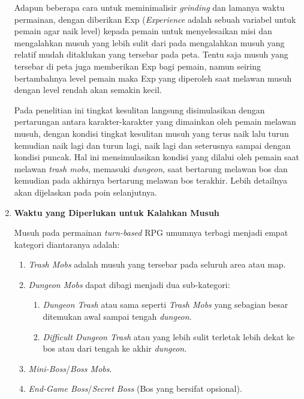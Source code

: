 \begin{subs}
\begin{enumerate}[label=\textbf{\arabic*).}]
		Adapun beberapa cara untuk meminimalisir \textit{grinding} dan lamanya waktu permainan, dengan diberikan Exp (\textit{Experience} adalah sebuah variabel untuk pemain agar naik level) kepada pemain untuk menyelesaikan misi dan mengalahkan musuh yang lebih sulit dari pada mengalahkan musuh yang relatif mudah ditaklukan yang tersebar pada peta. Tentu saja musuh yang tersebar di peta juga memberikan Exp bagi pemain, namun seiring bertambahnya level pemain maka Exp yang diperoleh saat melawan musuh dengan level rendah akan semakin kecil.
		\vspace{1ex}
		
		Pada penelitian ini tingkat kesulitan langsung disimulasikan dengan pertarungan antara karakter-karakter yang dimainkan oleh pemain melawan musuh, dengan kondisi tingkat kesulitan musuh yang terus naik lalu turun kemudian naik lagi dan turun lagi, naik lagi dan seterusnya sampai dengan kondisi puncak. Hal ini mensimulasikan kondisi yang dilalui oleh pemain saat melawan \textit{trash mobs}, memasuki \textit{dungeon}, saat bertarung melawan bos dan kemudian pada akhirnya bertarung melawan bos terakhir. Lebih detailnya akan dijelaskan pada poin selanjutnya.
		\vspace{1ex}
	
		\item \textbf{Waktu yang Diperlukan untuk Kalahkan Musuh}
	
		Musuh pada permainan \textit{turn-based} RPG umumnya terbagi menjadi empat kategori diantaranya adalah:
		
		\begin{enumerate}[label=\Alph*).]
			\item \textit{Trash Mobs} adalah musuh yang tersebar pada seluruh area atau map.
			\item \textit{Dungeon Mobs} dapat dibagi menjadi dua sub-kategori:
			\begin{enumerate}[label=\alph*).]
				\item \textit{Dungeon Trash} atau sama seperti \textit{Trash Mobs} yang sebagian besar ditemukan awal sampai tengah \textit{dungeon}.
				\item \textit{Difficult Dungeon Trash} atau yang lebih sulit terletak lebih dekat ke bos atau dari tengah ke akhir \textit{dungeon}.
			\end{enumerate}
			\item \textit{Mini-Boss}/\textit{Boss Mobs}.
			\item \textit{End-Game Boss}/\textit{Secret Boss} (Bos yang bersifat opsional).
		\end{enumerate}
		

\end{enumerate}
\end{subs}
